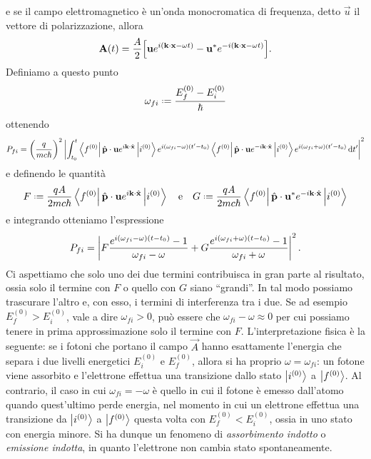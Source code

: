 e se il campo elettromagnetico è un'onda monocromatica di frequenza, detto $\vec u$ il vettore di polarizzazione, allora
\begin{equation}
	\mathbf{A}(t)=\frac{A}2\Big[\mathbf{u} e^{i({\mathbf{k}}\cdot{\mathbf{x}}-\omega t)}-\mathbf{u}^*e^{-i({\mathbf{k}}\cdot{\mathbf{x}}-\omega t)}\Big].
	\label{eq:campo-elettromagnetico-monocromatico}
\end{equation}
Definiamo a questo punto
\begin{equation}
	\omega_{fi}\defeq\frac{E_f^{(0)}-E_i^{(0)}}{\hbar}
	\label{eq:frequenza-transizione}
\end{equation}
ottenendo
\begin{equation}
	P_{fi}=\bigg(\frac{q}{mc\hbar}\bigg)^2\left|{\int_{t_0}^t
		\left\langle{f^{(0)}}\right|{\hat{\mathbf{p}}}\cdot{\mathbf{u}}e^{i{\mathbf{k}}\cdot{\hat{\mathbf{x}}}}\left|{i^{(0)}}\right\rangle e^{i(\omega_{fi}-\omega)(t'-t_0)}
		\left\langle{f^{(0)}}\right|{\hat{\mathbf{p}}}\cdot{\mathbf{u}}e^{-i{\mathbf{k}}\cdot{\hat{\mathbf{x}}}}\left|{i^{(0)}}\right\rangle e^{i(\omega_{fi}+\omega)(t'-t_0)}
	\,\textup{d} t'}\right|^2
\end{equation}
e definendo le quantità
\begin{equation}
	F\defeq\frac{qA}{2mc\hbar}\bra{f^{(0)}}\scalar{\op{\vec p}}{\vec u}e^{i\scalar{\vec k}{\op{\vec x}}}\ket{i^{(0)}}
	\qeq
	G\defeq\frac{qA}{2mc\hbar}\bra{f^{(0)}}\scalar{\op{\vec p}}{\vec u^*}e^{-i\scalar{\vec k}{\op{\vec x}}}\ket{i^{(0)}}
\end{equation}
e integrando otteniamo l'espressione
\begin{equation}
	P_{fi}=\left|{F\frac{e^{i(\omega_{fi}-\omega)(t-t_0)}-1}{\omega_{fi}-\omega}+G\frac{e^{i(\omega_{fi}+\omega)(t-t_0)}-1}{\omega_{fi}+\omega}}\right|^2.
\end{equation}
Ci aspettiamo che solo uno dei due termini contribuisca in gran parte al risultato, ossia solo il termine con $F$ o quello con $G$ siano ``grandi''.
In tal modo possiamo trascurare l'altro e, con esso, i termini di interferenza tra i due.
Se ad esempio $E_f^{(0)}>E_i^{(0)}$, vale a dire $\omega_{fi}>0$, può essere che $\omega_{fi}-\omega\approx 0$ per cui possiamo tenere in prima approssimazione solo il termine con $F$.
L'interpretazione fisica è la seguente: se i fotoni che portano il campo $\vec A$ hanno esattamente l'energia che separa i due livelli energetici $E_i^{(0)}$ e $E_f^{(0)}$, allora si ha proprio $\omega=\omega_{fi}$: un fotone viene assorbito e l'elettrone effettua una transizione dallo stato $\left|{i^{(0)}}\right\rangle$ a $\left|{f^{(0)}}\right\rangle$.
Al contrario, il caso in cui $\omega_{fi}=-\omega$ è quello in cui il fotone è emesso dall'atomo quando quest'ultimo perde energia, nel momento in cui un elettrone effettua una transizione da $\left|{i^{(0)}}\right\rangle$ a $\left|{f^{(0)}}\right\rangle$ questa volta con $E_f^{(0)}<E_i^{(0)}$, ossia in uno stato con energia minore.
Si ha dunque un fenomeno di \emph{assorbimento indotto} o \emph{emissione indotta}, in quanto l'elettrone non cambia stato spontaneamente.

